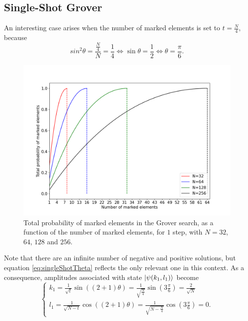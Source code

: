 \documentclass[../../dissertation.tex]{subfiles}
\begin{document}
\subsection{Single-Shot Grover}
An interesting case arises when the number of marked elements is set to $t=\frac{N}{4}$, because 
\begin{equation}
	sin^2\theta = \frac{\frac{N}{4}}{N} = \frac{1}{4} \iff \sin\theta = \frac{1}{2} \iff \theta = \frac{\pi}{6}. 
	\label{eq:singleShotTheta}
\end{equation}
\begin{figure}[h]
	\centering
	\includegraphics[scale=0.40]{img/Grover/GroverSingleShot3264128256}
	\caption{Total probability of marked elements in the Grover search, as a function of the number of marked elements, for $1$ step, with $N=32$, $64$, $128$ and $256$.} 
	\label{GroverSingleShot3264128256}
\end{figure}
Note that there are an infinite number of negative and positive solutions, but
equation \eqref{eq:singleShotTheta} reflects the only relevant one in this
context. As a consequence, amplitudes associated with state
$\ket{\psi(k_1,l_1)}$ become 
\begin{equation}
	\begin{cases}
		k_{1} = \frac{1}{\sqrt{t}} \sin{((2+1)\theta)} = \frac{1}{\sqrt{\frac{N}{4}}} \sin{(3\frac{\pi}{6})} = \frac{2}{\sqrt{N}}
		\\l_{1} = \frac{1}{\sqrt{N-t}}\cos{((2+1)\theta)} = \frac{1}{\sqrt{N-\frac{N}{4}}}\cos{(3\frac{\pi}{6})} = 0.
	\end{cases}\label{eq:groverSingleShotKandJ}
\end{equation}
\end{document}
